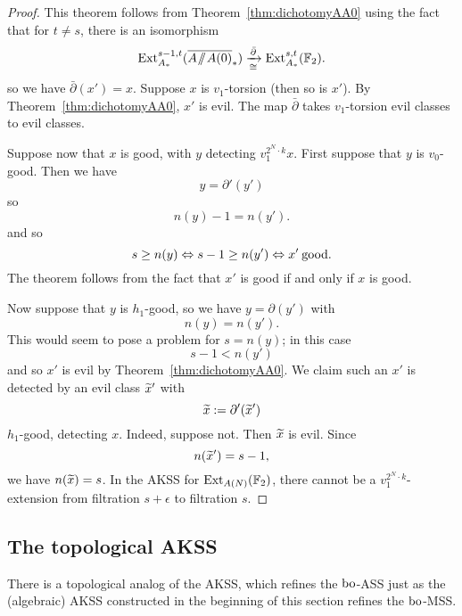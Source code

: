 \begin{proof}
This theorem follows from Theorem~\ref{thm:dichotomyAA0} using the fact that for $t \ne s$, there is an isomorphism
$$ \Ext^{s-1,t}_{A_*}(\AA0) \xrightarrow[\cong]{\bar{\partial}} \Ext^{s,t}_{A_*}(\FF_2). $$
so we have $\bar{\partial}(x') = x$.  Suppose $x$ is $v_1$-torsion (then so is $x'$).  By Theorem~\ref{thm:dichotomyAA0}, $x'$ is evil.  The map $\bar{\partial}$ takes $v_1$-torsion evil classes to evil classes.

Suppose now that $x$ is good, with $y$ detecting $v_1^{2^N\cdot k}x$.
First suppose that $y$ is $v_0$-good. Then we have
$$ y = \partial'(y') $$
so
$$ n(y)-1 = n(y'). $$
and so 
$$ s \ge n(y) \Leftrightarrow s-1 \ge n(y') \Leftrightarrow x' \: \mathrm{good}. $$
The theorem follows from the fact that $x'$ is good if and only if $x$ is good.

Now suppose that $y$ is $h_1$-good, so we have $y = \partial(y')$ with 
$$ n(y) = n(y'). $$
This would seem to pose a problem for $s = n(y)$; in this case 
$$ s-1 < n(y') $$
and so $x'$ is evil by Theorem~\ref{thm:dichotomyAA0}. We claim  such an $x'$ is detected by an evil class $\widetilde{x}'$ with
$$ \widetilde{x} := \partial'(\widetilde{x}') $$
$h_1$-good, detecting $x$.
Indeed, suppose not.  Then $\widetilde{x}$ is evil.  Since
$$ n(\widetilde{x}') = s-1, $$
we have $n(\widetilde{x}) = s$. In the AKSS for $\operatorname{Ext}_{A(N)}(\mathbb{F}_2)$, there cannot be a $v_1^{2^N\cdot k}$-extension from filtration $s+\epsilon$ to filtration $s$.
\end{proof}


\subsection*{The topological AKSS}

There is a topological analog of the AKSS, which refines the $\mathrm{bo}$-ASS just as the (algebraic) AKSS constructed in the beginning of this section refines the $\mathrm{bo}$-MSS.

